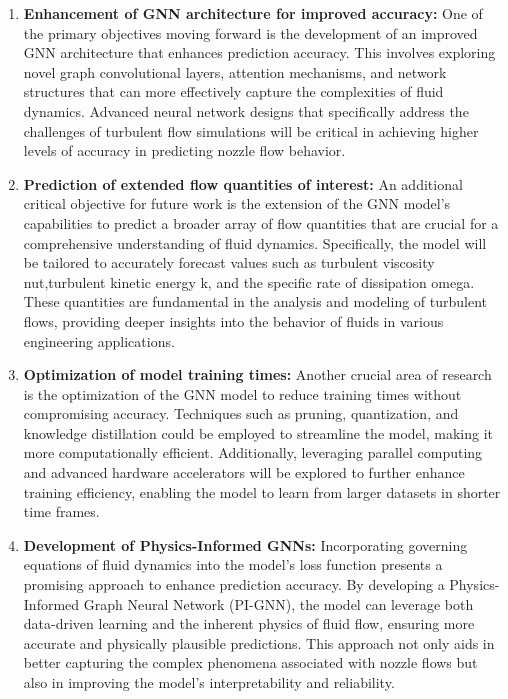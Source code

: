 \begin{enumerate}

    \item \textbf{Enhancement of GNN architecture for improved accuracy:} One of the primary objectives moving forward is the development of an improved GNN architecture that enhances prediction accuracy. This involves exploring novel graph convolutional layers, attention mechanisms, and network structures that can more effectively capture the complexities of fluid dynamics. Advanced neural network designs that specifically address the challenges of turbulent flow simulations will be critical in achieving higher levels of accuracy in predicting nozzle flow behavior.
    \item \textbf{Prediction of extended flow quantities of interest:} An additional critical objective for future work is the extension of the GNN model's capabilities to predict a broader array of flow quantities that are crucial for a comprehensive understanding of fluid dynamics. Specifically, the model will be tailored to accurately forecast values such as turbulent viscosity \gls{nut},turbulent kinetic energy k, and the specific rate of dissipation \gls{omega}. These quantities are fundamental in the analysis and modeling of turbulent flows, providing deeper insights into the behavior of fluids in various engineering applications.    
    \item \textbf{Optimization of model training times:} Another crucial area of research is the optimization of the GNN model to reduce training times without compromising accuracy. Techniques such as pruning, quantization, and knowledge distillation could be employed to streamline the model, making it more computationally efficient. Additionally, leveraging parallel computing and advanced hardware accelerators will be explored to further enhance training efficiency, enabling the model to learn from larger datasets in shorter time frames.
    
    \item \textbf{Development of Physics-Informed GNNs:} Incorporating governing equations of fluid dynamics into the model's loss function presents a promising approach to enhance prediction accuracy. By developing a Physics-Informed Graph Neural Network (PI-GNN), the model can leverage both data-driven learning and the inherent physics of fluid flow, ensuring more accurate and physically plausible predictions. This approach not only aids in better capturing the complex phenomena associated with nozzle flows but also in improving the model's interpretability and reliability.
    

\end{enumerate}
